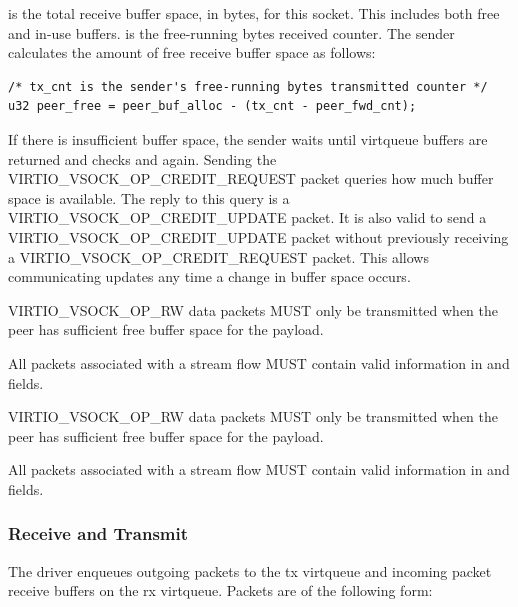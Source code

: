  is the total receive buffer space, in bytes, for this socket.
This includes both free and in-use buffers.  is the free-running
bytes received counter. The sender calculates the amount of free receive buffer
space as follows:

\begin{lstlisting}
/* tx_cnt is the sender's free-running bytes transmitted counter */
u32 peer_free = peer_buf_alloc - (tx_cnt - peer_fwd_cnt);
\end{lstlisting}

If there is insufficient buffer space, the sender waits until virtqueue buffers
are returned and checks  and  again. Sending
the VIRTIO_VSOCK_OP_CREDIT_REQUEST packet queries how much buffer space is
available. The reply to this query is a VIRTIO_VSOCK_OP_CREDIT_UPDATE packet.
It is also valid to send a VIRTIO_VSOCK_OP_CREDIT_UPDATE packet without
previously receiving a VIRTIO_VSOCK_OP_CREDIT_REQUEST packet. This allows
communicating updates any time a change in buffer space occurs.

VIRTIO_VSOCK_OP_RW data packets MUST only be transmitted when the peer has
sufficient free buffer space for the payload.

All packets associated with a stream flow MUST contain valid information in
 and  fields.

VIRTIO_VSOCK_OP_RW data packets MUST only be transmitted when the peer has
sufficient free buffer space for the payload.

All packets associated with a stream flow MUST contain valid information in
 and  fields.

\subsubsection{Receive and Transmit}\label{sec:Device Types / Socket Device / Device Operation / Receive and Transmit}
The driver enqueues outgoing packets to the tx virtqueue and incoming packet
receive buffers on the rx virtqueue. Packets are of the following form:

